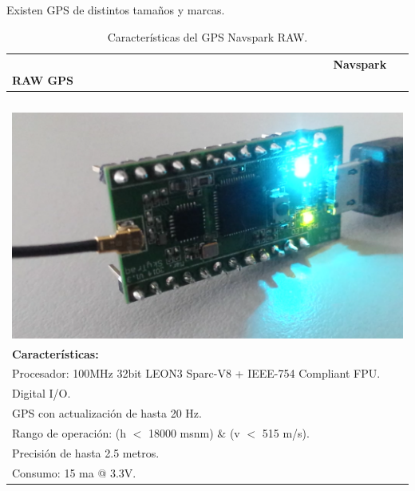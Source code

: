 Existen GPS de distintos tamaños y marcas.

\begin{table}[!htb]
\begin{center}
\caption{Características del GPS Navspark RAW.}
\begin{tabular}{|l|}
	\hline
	        \ \ \ \ \ \ \ \ \ \ \ \ \ \ \ \ \ \ \ \ \ \ \ \ \ \ \ \ \ \ \ \ \ \ \ \ \ \ \ \ \ \ \ \ \ \ \ \ \ \ \textbf{Navspark RAW GPS} \\
	\hline
		\\  \ \ \ \ \ \ \ \ \ \ \ \ \ \ \ \ \ \ \ \ \ \ \ \ \ \ \ \ \ \ \ \ \ \ \ \ \ \ \ \ \includegraphics[width=0.37\linewidth]{Figures/NavGPS}
		\label{fig:nsraw}\\
	
	\textbf{Características:}\\
		\tabitem Procesador: 100MHz 32bit LEON3 Sparc-V8 + IEEE-754 Compliant FPU.\\
		\tabitem 17 Digital I/O.\\
		\tabitem GPS con actualización de hasta 20 Hz.\\
		\tabitem Rango de operación: (h $<$ 18000 msnm) \& (v $<$ 515 m/s).\\
		\tabitem Precisión de hasta 2.5 metros.\\
		\tabitem Consumo: 15 ma @ 3.3V.\\
	\hline
\end{tabular}
\end{center}
\end{table}

